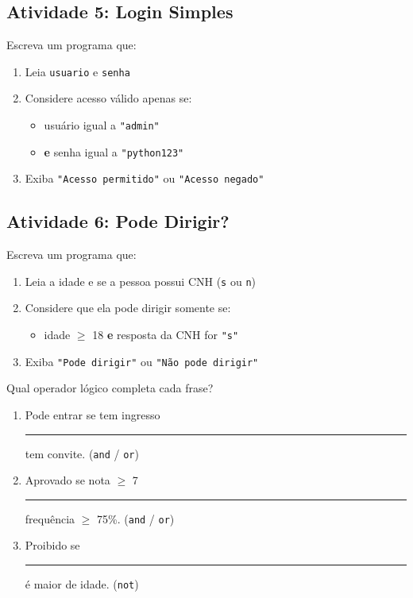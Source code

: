 \documentclass[12pt]{article}
\begin{document}
\subsection*{Atividade 5: Login Simples}
Escreva um programa que:
\begin{enumerate}
    \item Leia \texttt{usuario} e \texttt{senha}
    \item Considere acesso válido apenas se:
    \begin{itemize}
        \item usuário igual a \texttt{"admin"}
        \item \textbf{e} senha igual a \texttt{"python123"}
    \end{itemize}
    \item Exiba \texttt{"Acesso permitido"} ou \texttt{"Acesso negado"}
\end{enumerate}

\subsection*{Atividade 6: Pode Dirigir?}
Escreva um programa que:
\begin{enumerate}
    \item Leia a idade e se a pessoa possui CNH (\texttt{s} ou \texttt{n})
    \item Considere que ela pode dirigir somente se:
    \begin{itemize}
        \item idade $\geq$ 18 \textbf{e} resposta da CNH for \texttt{"s"}
    \end{itemize}
    \item Exiba \texttt{"Pode dirigir"} ou \texttt{"Não pode dirigir"}
\end{enumerate}

\begin{fixacaobox}
Qual operador lógico completa cada frase?
\begin{enumerate}
    \item Pode entrar se tem ingresso \rule{2cm}{0.4pt} tem convite. (\texttt{and} / \texttt{or})
    \item Aprovado se nota $\geq$ 7 \rule{2cm}{0.4pt} frequência $\geq$ 75\%. (\texttt{and} / \texttt{or})
    \item Proibido se \rule{2cm}{0.4pt} é maior de idade. (\texttt{not})
\end{enumerate}
\end{fixacaobox}
\end{document}
